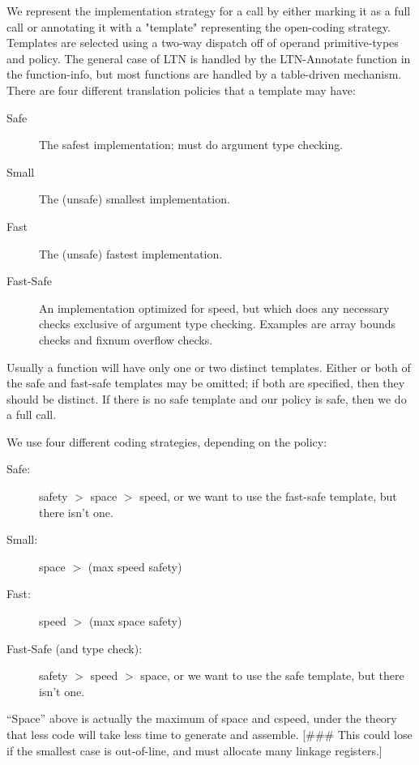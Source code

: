 We represent the implementation strategy for a call by either marking it as a
full call or annotating it with a "template" representing the open-coding
strategy.  Templates are selected using a two-way dispatch off of operand
primitive-types and policy.  The general case of LTN is handled by the
LTN-Annotate function in the function-info, but most functions are handled by a
table-driven mechanism.  There are four different translation policies that a
template may have:
\begin{description}
\item[Safe]
        The safest implementation; must do argument type checking.

\item[Small]
        The (unsafe) smallest implementation.

\item[Fast]
        The (unsafe) fastest implementation.

\item[Fast-Safe]
        An implementation optimized for speed, but which does any necessary
        checks exclusive of argument type checking.  Examples are array bounds
        checks and fixnum overflow checks.
\end{description}

Usually a function will have only one or two distinct templates.  Either or
both of the safe and fast-safe templates may be omitted; if both are specified,
then they should be distinct.  If there is no safe template and our policy is
safe, then we do a full call.

We use four different coding strategies, depending on the policy:
\begin{description}
\item[Safe:]  safety $>$ space $>$ speed, or
we want to use the fast-safe template, but there isn't one.

\item[Small:] space $>$ (max speed safety)

\item[Fast:] speed $>$ (max space safety)

\item[Fast-Safe (and type check):] safety $>$ speed $>$ space, or we want to use
the safe template, but there isn't one.
\end{description}

``Space'' above is actually the maximum of space and cspeed, under the theory
that less code will take less time to generate and assemble.  [\#\#\# This could
lose if the smallest case is out-of-line, and must allocate many linkage
registers.]

